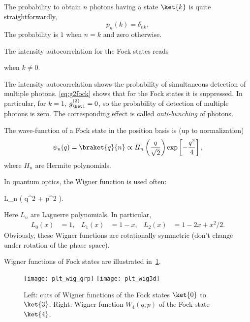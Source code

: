 \documentclass[fontsize=9pt,twoside=semi,bookmarkpackage=false]{scrartcl}
\newcommand*{\mybx}[1]{\colorbox{mygr!15}{\hspace{1em}#1\hspace{1em}}}
\begin{document}
The probability to obtain $n$ photons having a state $\ket{k}$ is quite straightforwardly,
\begin{equation}
  p_n (k) = \delta_{nk },
\end{equation}
The probability is $1$ when $n = k$ and zero otherwise.

The intensity autocorrelation for the Fock states reads
when $k \neq 0$.

The intensity autocorrelation shows the probability of simultaneous detection of multiple photons.
\cref{eq:g2fock} shows that for the Fock states it is suppressed.
In particular, for $k = 1$, $g^{(2)}_{\ket 1} = 0$, so the probability of detection of multiple photons is zero.
The corresponding effect is called \emph{anti-bunching} of photons.

The wave-function of a Fock state in the position basis is (up to normalization)
\begin{equation}
  \psi_n (q) = \braket{ q }{ n }
  \propto H_n \left( \frac{ q }{ \sqrt{ 2 }} \right)
  \exp\left[ - \frac{ q ^2 }{ 4 } \right],
\end{equation}
where $H_n$ are Hermite polynomials.

In quantum optics, the Wigner function is used often:
\begin{empheq}[box=\mybx]{equation}
  W_n (q , p ) = \frac{ ( -1 )^{-1} }{ 2 \pi }
  \exp\left[ - \frac{ q^2 + p^2 }{ 2 } \right]
  L_n ( q^2 + p^2 ).
\end{empheq}
Here $L_n$ are Laguerre polynomials.
In particular,
\begin{align}
  L_0 (x) & = 1, &
  L_1 (x) & = 1 - x, &
  L_2 (x) & = 1 - 2 x + x^2 / 2.
\end{align}
Obviously, these Wigner functions are rotationally symmetric (don't change under rotation of the phase space).

Wigner functions of Fock states are illustrated in~\cref{fig:plt_wig_fock}.

\begin{figure}[htb]
  \centering
  \texttt{[image: plt\_wig\_grp]}
  \texttt{[image: plt\_wig3d]}
  \caption{
    Left: cuts of Wigner functions of the Fock states $\ket{0}$ to $\ket{3}$.
    Right: Wigner function $W_4(q,p)$ of the Fock state $\ket{4}$.
  }
  \label{fig:plt_wig_fock}
\end{figure}
\end{document}

